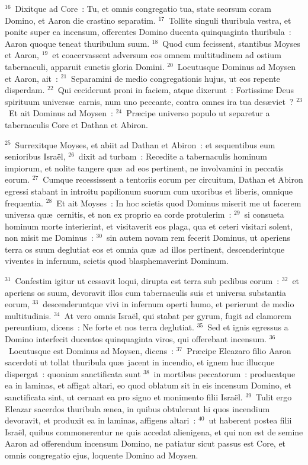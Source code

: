 ${}^{16}$~Dixitque ad Core~: Tu, et omnis congregatio tua, state seorsum coram Domino, et Aaron die crastino separatim.
${}^{17}$~Tollite singuli thuribula vestra, et ponite super ea incensum, offerentes Domino ducenta quinquaginta thuribula~: Aaron quoque teneat thuribulum suum.
${}^{18}$~Quod cum fecissent, stantibus Moyses et Aaron,
${}^{19}$~et coacervassent adversum eos omnem multitudinem ad ostium tabernaculi, apparuit cunctis gloria Domini.
${}^{20}$~Locutusque Dominus ad Moysen et Aaron, ait~:
${}^{21}$~Separamini de medio congregationis hujus, ut eos repente disperdam.
${}^{22}$~Qui ceciderunt proni in faciem, atque dixerunt~: Fortissime Deus spirituum univers\ae\ carnis, num uno peccante, contra omnes ira tua des\ae viet~?
${}^{23}$~Et ait Dominus ad Moysen~:
${}^{24}$~Pr\ae cipe universo populo ut separetur a tabernaculis Core et Dathan et Abiron.


${}^{25}$~Surrexitque Moyses, et abiit ad Dathan et Abiron~: et sequentibus eum senioribus Isra\"el,
${}^{26}$~dixit ad turbam~: Recedite a tabernaculis hominum impiorum, et nolite tangere qu\ae\ ad eos pertinent, ne involvamini in peccatis eorum.
${}^{27}$~Cumque recessissent a tentoriis eorum per circuitum, Dathan et Abiron egressi stabant in introitu papilionum suorum cum uxoribus et liberis, omnique frequentia.
${}^{28}$~Et ait Moyses~: In hoc scietis quod Dominus miserit me ut facerem universa qu\ae\ cernitis, et non ex proprio ea corde protulerim~:
${}^{29}$~si consueta hominum morte interierint, et visitaverit eos plaga, qua et ceteri visitari solent, non misit me Dominus~:
${}^{30}$~sin autem novam rem fecerit Dominus, ut aperiens terra os suum deglutiat eos et omnia qu\ae\ ad illos pertinent, descenderintque viventes in infernum, scietis quod blasphemaverint Dominum.


${}^{31}$~Confestim igitur ut cessavit loqui, dirupta est terra sub pedibus eorum~:
${}^{32}$~et aperiens os suum, devoravit illos cum tabernaculis suis et universa substantia eorum,
${}^{33}$~descenderuntque vivi in infernum operti humo, et perierunt de medio multitudinis.
${}^{34}$~At vero omnis Isra\"el, qui stabat per gyrum, fugit ad clamorem pereuntium, dicens~: Ne forte et nos terra deglutiat.
${}^{35}$~Sed et ignis egressus a Domino interfecit ducentos quinquaginta viros, qui offerebant incensum.
${}^{36}$~Locutusque est Dominus ad Moysen, dicens~:
${}^{37}$~Pr\ae cipe Eleazaro filio Aaron sacerdoti ut tollat thuribula qu\ae\ jacent in incendio, et ignem huc illucque dispergat~: quoniam sanctificata sunt
${}^{38}$~in mortibus peccatorum~: producatque ea in laminas, et affigat altari, eo quod oblatum sit in eis incensum Domino, et sanctificata sint, ut cernant ea pro signo et monimento filii Isra\"el.
${}^{39}$~Tulit ergo Eleazar sacerdos thuribula \ae nea, in quibus obtulerant hi quos incendium devoravit, et produxit ea in laminas, affigens altari~:
${}^{40}$~ut haberent postea filii Isra\"el, quibus commonerentur ne quis accedat alienigena, et qui non est de semine Aaron ad offerendum incensum Domino, ne patiatur sicut passus est Core, et omnis congregatio ejus, loquente Domino ad Moysen.



